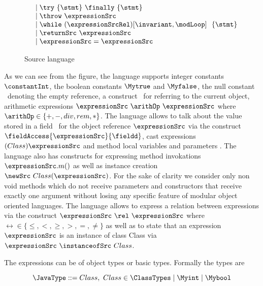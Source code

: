 \begin{figure}[ht!]
\begin{frameit}
$$\begin{array} {ll}
		                & \mid \try  \ \{ \stmt \} \ \finally \ \{ \stmt \} \\
				& \mid \throw \ \expressionSrc  \\
                                & \mid \while \ (\expressionSrcRel) \lbrack \invariant, \modLoop \rbrack \ \do \ \{ \stmt \}\ \\
				& \mid \returnSrc \  \expressionSrc \\
                   		& \mid \expressionSrc = \expressionSrc \\        
    \end{array} $$
\caption{\sc Source language}
\label{source:grammar}
\end{frameit}
\end{figure}


    As we can see from the figure, the language supports 
    integer constants $\constantInt$, the boolean constants  $ \Mytrue$ and $\Myfalse$, the null constant \Mynull \ 
    denoting  the empty reference, a construct \this \ for referring to the current object,  
    arithmetic expressions  $\expressionSrc \ \arithOp \ \expressionSrc$ where $\arithOp \in  \{+ , - , div , rem, * \}$.
    The language  allows to talk about the value stored in a field \fieldd \ for the object reference $\expressionSrc $
    via the construct  $ \fieldAccess{\expressionSrc}{\fieldd} $, cast expressions  $(Class) \expressionSrc$
    and method local variables  and parameters \var.  
    The language also has constructs for expressing method invokations  $ \expressionSrc.m()  $  as well as instance creation
    $\newSrc \ Class(\expressionSrc )$. For the sake of clarity we consider only non void  methods which do not receive parameters and constructors
    that receive exactly one argument without losing
    any specific feature   of modular object oriented  languages. 
    The language allows to express a relation between  expressions via the construct
     $\expressionSrc \ \rel \ \expressionSrc $ where $\rel  \in \{ \le, < ,  \ge, >, = , \neq \}$ as well as to state that an expression 
   $\expressionSrc$ is an instance of class Class via  $\expressionSrc \ \instanceofSrc \ Class$.
    
    The expressions can be of object types or basic types. Formally the types are 

    $$
\JavaType ::= Class, \ Class \in \ClassTypes \mid \Myint \mid \Mybool
$$ 





